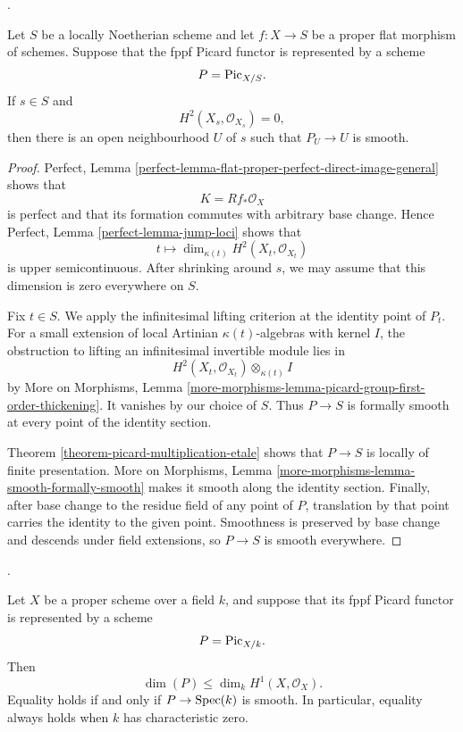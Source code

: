 \begin{lemma}
\label{lemma-picard-H2-vanishing-smooth-neighbourhood}
\begin{reference}
\cite[Expos\'e 236, Proposition 2.10(ii), p. 236]{FGA}.
\end{reference}
Let $S$ be a locally Noetherian scheme and let $f:X\to S$ be a proper flat
morphism of schemes. Suppose that the fppf Picard functor is represented by a
scheme
$$
P=\mathrm{Pic}_{X/S}.
$$
If $s\in S$ and
$$
H^2(X_s,\mathcal O_{X_s})=0,
$$
then there is an open neighbourhood $U$ of $s$ such that $P_U\to U$ is
smooth.
\end{lemma}

\begin{proof}
Perfect, Lemma
\ref{perfect-lemma-flat-proper-perfect-direct-image-general} shows that
$$
K=Rf_*\mathcal O_X
$$
is perfect and that its formation commutes with arbitrary base change. Hence
Perfect, Lemma \ref{perfect-lemma-jump-loci} shows that
$$
t\longmapsto \dim_{\kappa(t)}H^2(X_t,\mathcal O_{X_t})
$$
is upper semicontinuous. After shrinking around $s$, we may assume that this
dimension is zero everywhere on $S$.

Fix $t\in S$. We apply the infinitesimal lifting criterion at the identity
point of $P_t$. For a small extension of local Artinian $\kappa(t)$-algebras
with kernel $I$, the obstruction to lifting an infinitesimal invertible
module lies in
$$
H^2(X_t,\mathcal O_{X_t})\otimes_{\kappa(t)}I
$$
by More on Morphisms, Lemma
\ref{more-morphisms-lemma-picard-group-first-order-thickening}. It vanishes by
our choice of $S$. Thus $P\to S$ is formally smooth at every point of the
identity section.

Theorem \ref{theorem-picard-multiplication-etale} shows that $P\to S$ is
locally of finite presentation. More on Morphisms, Lemma
\ref{more-morphisms-lemma-smooth-formally-smooth} makes it smooth along the
identity section. Finally, after base change to the residue field of any
point of $P$, translation by that point carries the identity to the given
point. Smoothness is preserved by base change and descends under field
extensions, so $P\to S$ is smooth everywhere.
\end{proof}

\begin{lemma}
\label{lemma-picard-tangent-dimension}
\begin{reference}
\cite[Expos\'e 236, Proposition 2.10(iii), p. 236]{FGA}.
\end{reference}
Let $X$ be a proper scheme over a field $k$, and suppose that its fppf Picard
functor is represented by a scheme
$$
P=\mathrm{Pic}_{X/k}.
$$
Then
$$
\dim(P)\leq\dim_k H^1(X,\mathcal O_X).
$$
Equality holds if and only if $P\to\mathop{\mathrm{Spec}}(k)$ is smooth. In particular,
equality always holds when $k$ has characteristic zero.
\end{lemma}

